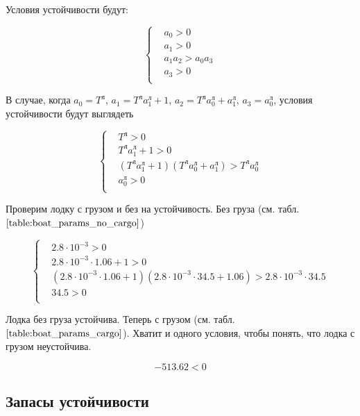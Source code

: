 \documentclass[12pt,a4paper]{article}
\begin{document}
Условия устойчивости будут:

\begin{equation*}
	\begin{cases}
		&a_0 > 0 \\
		&a_1 > 0 \\
		&a_1a_2 > a_0a_3 \\
		&a_3 > 0 \\
	\end{cases}
\end{equation*}

В случае, когда $a_0 = T^\text{л}$, $a_1 = T^\text{л} a_1^\text{л} + 1$, $a_2 = T^\text{л} a_0^\text{л} + a_1^\text{л}$, $a_3 = a_0^\text{л}$, условия устойчивости будут выглядеть

\begin{equation*}
	\begin{cases}
		&T^\text{л} > 0 \\
		&T^\text{л}a_1^\text{л} + 1 > 0 \\
		&(T^\text{л}a_1^\text{л} + 1)(T^\text{л}a_0^\text{л} + a_1^\text{л}) > T^\text{л}a_0^\text{л} \\
		&a_0^\text{л} > 0 \\
	\end{cases}
\end{equation*}

Проверим лодку с грузом и без на устойчивость. Без груза (см. табл. $\ref{table:boat_params_no_cargo}$)

\begin{equation*}
	\begin{cases}
		&2.8 \cdot 10^{-3} > 0 \\
		&2.8 \cdot 10^{-3} \cdot 1.06 + 1 > 0 \\
		& (2.8 \cdot 10^{-3} \cdot 1.06 + 1)(2.8 \cdot 10^{-3} \cdot 34.5 + 1.06) > 2.8 \cdot 10^{-3} \cdot 34.5 \\
		&34.5 > 0 \\
	\end{cases}
\end{equation*}

Лодка без груза устойчива. Теперь с грузом (см. табл. $\ref{table:boat_params_cargo}$). Хватит и одного условия, чтобы понять, что лодка с грузом неустойчива.

$$ -513.62 < 0 $$

\subsection{Запасы устойчивости} 
\end{document}
